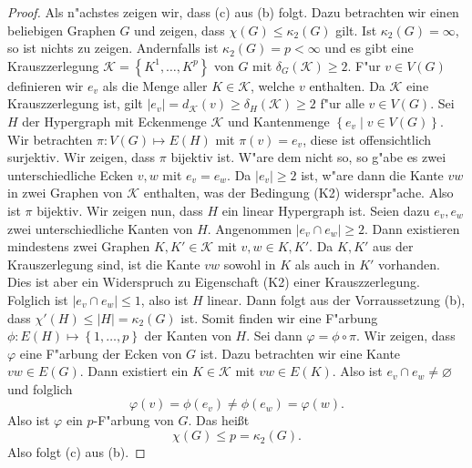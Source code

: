 \begin{proof}
Als n"achstes zeigen wir, dass (c) aus (b) folgt. 
  Dazu betrachten wir einen beliebigen Graphen $G$ und zeigen, dass $\chi(G) \leq \kappa_{2}(G)$ gilt. Ist $\kappa_{2}(G) = \infty$, so ist nichts zu zeigen. Andernfalls ist $\kappa_{2}(G) = p < \infty $ und es gibt eine Krauszzerlegung $\mathcal{K}= \left\{ K^{1},\dots,K^{p} \right\}$ von $G$ mit $\delta_{G}(\mathcal{K}) \geq 2 $.  
  F"ur $v\in V(G)$ definieren wir $e_v$ als die Menge aller $K\in \mathcal{K}$, welche $v$ enthalten. Da $\mathcal{K}$ eine Krauszzerlegung ist, gilt $|e_v| = d_{\mathcal{K}}(v)\geq \delta_{H}(\mathcal{K}) \geq 2$ f"ur alle $v \in V(G)$. Sei $H$ der Hypergraph mit Eckenmenge $\mathcal{K}$ und Kantenmenge $\left\{ e_v\;|\; v\in V(G) \right\}$. Wir betrachten $\pi: V(G) \mapsto E(H)$ mit $\pi(v) = e_v$, diese ist offensichtlich surjektiv. Wir zeigen, dass $\pi$ bijektiv ist. W"are dem nicht so, so g"abe es zwei unterschiedliche Ecken $v,w$ mit $e_v = e_w$. 
  Da $|e_v| \geq 2$ ist,  w"are dann die Kante $vw$ in zwei Graphen von $\mathcal{K}$ enthalten, was der Bedingung (K2) widerspr"ache. Also ist $\pi$ bijektiv.
  Wir zeigen nun, dass $H$ ein linear Hypergraph ist. 
  Seien dazu $e_{v},e_{w} $ zwei unterschiedliche Kanten von $H$.
  Angenommen $|e_{v}\cap e_{w}| \geq 2$. Dann existieren mindestens zwei Graphen $K,K' \in \mathcal{K}$ mit $v,w \in K,K'$. Da $K,K'$ aus der Krauszerlegung sind, ist die Kante $vw$ sowohl in $K$ als auch in $K'$ vorhanden. Dies ist aber ein Widerspruch zu Eigenschaft (K2) einer Krauszzerlegung.
  Folglich ist $|e_{v}\cap e_{w}| \leq 1$, also ist $H$ linear. Dann folgt aus der Vorraussetzung (b), dass $\chi'(H) \leq |H| = \kappa_{2}(G)$ ist.
  Somit finden wir eine F"arbung $\phi : E(H) \mapsto \left\{ 1,\dots,p \right\}$ der Kanten von $H$. Sei dann $\varphi =  \phi \circ \pi$. Wir zeigen, dass $\varphi$ eine F"arbung der Ecken von $G$ ist. Dazu betrachten wir eine Kante $vw\in E(G)$. Dann existiert ein $K\in \mathcal{K}$ mit $vw\in E(K)$. Also ist $e_v\cap e_w \neq \varnothing$ und folglich \begin{equation*}
    \varphi(v) = \phi(e_v) \neq \phi(e_w) = \varphi(w).
  \end{equation*} 
  Also ist $\varphi$ ein $p$-F"arbung von $G$. Das hei{\ss}t
  \begin{equation*}
    \chi(G) \leq p = \kappa_{2}(G).
  \end{equation*}
  Also folgt (c) aus (b).


\end{proof}
